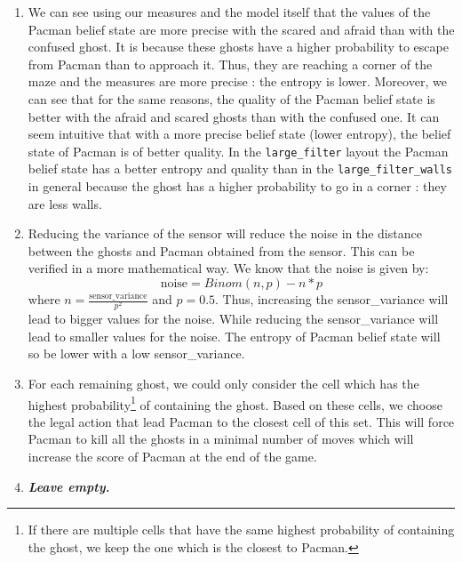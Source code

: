 \documentclass{article}
\begin{document}
\begin{enumerate}[label=\alph*.,leftmargin=*]
    \item We can see using our measures and the model itself that the values of the Pacman belief state are more precise with the scared and afraid than with the confused ghost. It is because these ghosts have a higher probability to escape from Pacman than to approach it. Thus, they are reaching a corner of the maze and the measures are more precise : the entropy is lower.
    Moreover, we can see that for the same reasons, the quality of the Pacman belief state is better with the afraid and scared ghosts than with the confused one. It can seem intuitive that with a more precise belief state (lower entropy), the belief state of Pacman is of better quality. In the \texttt{large\_filter} layout the Pacman belief state has a better entropy and quality than in the \texttt{large\_filter\_walls} in general because the ghost has a higher probability to go in a corner : they are less walls.
    \item Reducing the variance of the sensor will reduce the noise in the distance between the ghosts and Pacman obtained from the sensor. This can be verified in a more mathematical way. We know that the noise is given by: $$\text{noise} = Binom(n, p) - n * p$$
    where $n = \frac{\text{sensor\_variance}}{p^2}$ and $p = 0.5$. Thus, increasing the sensor\_variance will lead to bigger values for the noise. While reducing the sensor\_variance will lead to smaller values for the noise. The entropy of Pacman belief state will so be lower with a low sensor\_variance.
    
    \item For each remaining ghost, we could only consider the cell which has the highest probability\footnote{If there are multiple cells that have the same highest probability of containing the ghost, we keep the one which is the closest to Pacman.} of containing the ghost. Based on these cells, we choose the legal action that lead Pacman to the closest cell of this set. This will force Pacman to kill all the ghosts in a minimal number of moves which will increase the score of Pacman at the end of the game.
    \item \textbf{\textit{Leave empty.}}
\end{enumerate}

\end{document}
